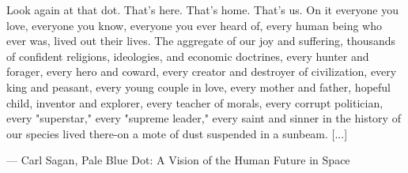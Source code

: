 
\clearforchapter
\thispagestyle{empty}

\begin{center}
  \vspace*{200pt}
  \let\oldepigraphwidth\epigraphwidth
  \setlength{\epigraphwidth}{12.0cm}
  \epigraph{
    \normalsize
    Look again at that dot. That's here. That's home. That's us. On it everyone you love, everyone you know, everyone you ever heard of, every human being who ever was, lived out their lives. The aggregate of our joy and suffering, thousands of confident religions, ideologies, and economic doctrines, every hunter and forager, every hero and coward, every creator and destroyer of civilization, every king and peasant, every young couple in love, every mother and father, hopeful child, inventor and explorer, every teacher of morals, every corrupt politician, every "superstar," every "supreme leader," every saint and sinner in the history of our species lived there-on a mote of dust suspended in a sunbeam. [...]
  }%
  {\textup{--- Carl Sagan, Pale Blue Dot: A Vision of the Human Future in Space}}
  \let\epigraphwidth\oldepigraphwidth
\end{center}

\cleardoublepage
